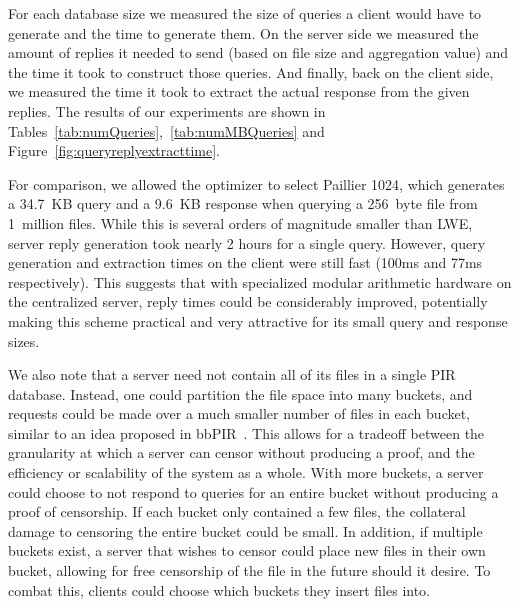 \TabNumQueries
For each database size we measured the size of queries a client would have to
generate and the time to generate them. On the
server side we measured the amount of replies it needed to send (based on file
size and aggregation value) and the time it took to construct those queries. And
finally, back on the client side, we measured the time it took to extract the
actual response from the given replies. The results of our experiments are
shown in  Tables~\ref{tab:numQueries},~\ref{tab:numMBQueries} and
Figure~\ref{fig:queryreplyextracttime}.

\FigAllTimes
\TabNumMBQueries

For comparison, we allowed the optimizer to select
Paillier 1024, which generates a 34.7~KB query and a 9.6~KB response when
querying a 256~byte file from 1~million files.  While this is several orders of
magnitude smaller than LWE, server reply generation took nearly 2 hours for a
single query. However, query generation and extraction times on the client were
still fast (100ms and 77ms respectively).  This suggests that with specialized
modular arithmetic hardware on the centralized server, reply times could
be considerably improved, potentially making this scheme practical and very
attractive for its small query and response sizes.

%
%

We also note that a server need not contain all of its files in a single
PIR database. Instead, one could partition the file space into many buckets, and
requests could be made over a much smaller number of files in each bucket,
similar to an idea proposed in bbPIR~\cite{bbPIR}. This
allows for a tradeoff between the granularity at which a server can censor
without producing a proof, and the efficiency or scalability of the system as a
whole. With more buckets, a server could choose to not respond to queries for an
entire bucket without producing a proof of censorship. If each bucket only
contained a few files, the collateral damage to censoring the entire bucket
could be small. In addition, if multiple buckets exist, a server that wishes to
censor could place new files in their own bucket, allowing for free censorship
of the file in the future should it desire. To combat this, clients could choose
which buckets they insert files into.


